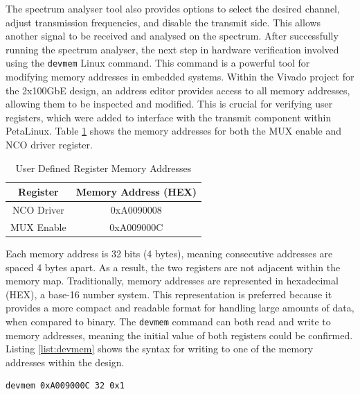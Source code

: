 \documentclass[12pt, a4paper]{article}
\begin{document}
The spectrum analyser tool also provides options to select the desired channel, adjust transmission frequencies, and disable the transmit side. This allows another signal to be received and analysed on the spectrum. After successfully running the spectrum analyser, the next step in hardware verification involved using the \texttt{devmem} Linux command. This command is a powerful tool for modifying memory addresses in embedded systems. Within the Vivado project for the 2x100GbE design, an address editor provides access to all memory addresses, allowing them to be inspected and modified. This is crucial for verifying user registers, which were added to interface with the transmit component within PetaLinux. Table \ref{tab:memory_addresses} shows the memory addresses for both the MUX enable and NCO driver register.

\begin{table}[h]
    \centering
    \begin{tabular}{|c|c|}\hline
        \textbf{Register} & \textbf{Memory Address (HEX)} \\\hline
        NCO Driver & 0xA0090008\\\hline
        MUX Enable & 0xA009000C\\\hline
    \end{tabular}
    \caption{User Defined Register Memory Addresses}
    \label{tab:memory_addresses}
\end{table}

Each memory address is 32 bits (4 bytes), meaning consecutive addresses are spaced 4 bytes apart. As a result, the two registers are not adjacent within the memory map. Traditionally, memory addresses are represented in hexadecimal (HEX), a base-16 number system. This representation is preferred because it provides a more compact and readable format for handling large amounts of data, when compared to binary. The \texttt{devmem} command can both read and write to memory addresses, meaning the initial value of both registers could be confirmed. Listing \ref{list:devmem} shows the syntax for writing to one of the memory addresses within the design.

\begin{listing}[h]
\begin{verbatim}
devmem 0xA009000C 32 0x1
\end{verbatim}
\caption{Devmem Memory Address Write Operation}
\label{list:devmem}
\end{listing}
 
\end{document}
